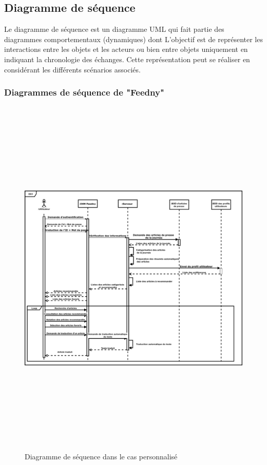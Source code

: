 \subsection{Diagramme de séquence}
Le diagramme de séquence est un diagramme UML qui fait partie des diagrammes comportementaux (dynamiques) dont L'objectif est de représenter les interactions entre les objets et les acteurs ou bien entre objets uniquement  en indiquant la chronologie des échanges. Cette représentation peut se réaliser en considérant les différents scénarios associés.\cite{UML}


\subsubsection{Diagrammes de séquence de "Feedny"}

\begin{figure}[H]
    \centering
    \includegraphics[height=500pt,width=425pt]{img/chapter3/diagseqperso.png}
    \caption{Diagramme de séquence dans le cas personnalisé}
\end{figure}


